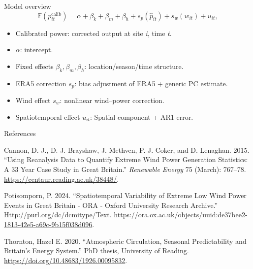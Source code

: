 \documentclass[
  12pt,
  ignorenonframetext,
  aspectratio=169,
]{beamer}
\providecommand{\tightlist}{%
  \setlength{\itemsep}{0pt}\setlength{\parskip}{0pt}}\usepackage{longtable,booktabs,array}
\newlength{\cslhangindent}
\newlength{\cslentryspacingunit} %
\newenvironment{CSLReferences}[2] %
 {%
  \setlength{\parindent}{0pt}
  \ifodd #1
  \let\oldpar\par
  \def\par{\hangindent=\cslhangindent\oldpar}
  \fi
  \setlength{\parskip}{#2\cslentryspacingunit}
 }%
 {}
\begin{document}
\begin{frame}{Model overview}
\protect\hypertarget{model-overview}{}
\begin{equation}
    \mathbb{E}(p^{\mathrm{calib}}_{it})
    = \alpha + \beta_{k} + \beta_m + \beta_h
    + s_p(\hat{p}_{it}) + s_w(w_{it})
    + u_{it},
    \label{eq:bayes_spat}
  \end{equation}

\begin{itemize}
\tightlist
\item
  Calibrated power: corrected output at site \emph{i}, time \emph{t}.\\
\item
  \(\alpha\): intercept.\\
\item
  Fixed effects \(\beta_k, \beta_m, \beta_h\): location/season/time
  structure.
\item
  ERA5 correction \(s_p\): bias adjustment of ERA5 + generic PC
  estimate.\\
\item
  Wind effect \(s_w\): nonlinear wind--power correction.\\
\item
  Spatiotemporal effect \(u_{it}\): Spatial component + AR1 error.
\end{itemize}
\end{frame}

\begin{frame}{References}
\protect\hypertarget{references}{}
\hypertarget{refs}{}
\begin{CSLReferences}{1}{0}
\leavevmode{}%
Cannon, D. J., D. J. Brayshaw, J. Methven, P. J. Coker, and D. Lenaghan.
2015. {``Using Reanalysis Data to Quantify Extreme Wind Power Generation
Statistics: A 33 Year Case Study in Great Britain.''} \emph{Renewable
Energy} 75 (March): 767--78. \url{https://centaur.reading.ac.uk/38448/}.

\leavevmode{}%
Potisomporn, P. 2024. {``Spatiotemporal Variability of Extreme Low Wind
Power Events in Great Britain - {ORA} - Oxford University Research
Archive.''} Http://purl.org/dc/dcmitype/Text.
\url{https://ora.ox.ac.uk/objects/uuid:de37bee2-1813-42e5-a69c-9b15f038d096}.

\leavevmode{}%
Thornton, Hazel E. 2020. {``Atmospheric Circulation, Seasonal
Predictability and Britain's Energy System.''} PhD thesis, University of
Reading. \url{https://doi.org/10.48683/1926.00095832}.

\end{CSLReferences}
\end{frame}
\end{document}
